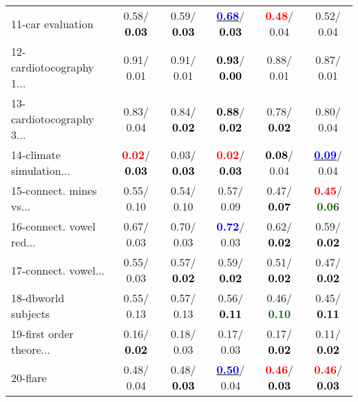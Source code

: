 \begin{table}[h]
\begin{center}
\begin{tabular}{lc|c|c|c|c}
11-car evaluation &   0.58/\textcolor{black}{\textbf{  0.03}} &   0.59/\textcolor{black}{\textbf{  0.03}} & \underline{\textcolor{blue}{\textbf{  0.68}}}/\textcolor{black}{\textbf{  0.03}} & \textcolor{red}{\textbf{  0.48}}/  0.04 &   0.52/  0.04 \\
12-cardiotocography 1... &   0.91/  0.01 &   0.91/  0.01 & \textcolor{black}{\textbf{  0.93}}/\textcolor{black}{\textbf{  0.00}} &   0.88/  0.01 &   0.87/  0.01 \\
13-cardiotocography 3... &   0.83/  0.04 &   0.84/\textcolor{black}{\textbf{  0.02}} & \textcolor{black}{\textbf{  0.88}}/\textcolor{black}{\textbf{  0.02}} &   0.78/\textcolor{black}{\textbf{  0.02}} &   0.80/  0.04 \\
14-climate simulation... & \textcolor{red}{\textbf{  0.02}}/\textcolor{black}{\textbf{  0.03}} &   0.03/\textcolor{black}{\textbf{  0.03}} & \textcolor{red}{\textbf{  0.02}}/\textcolor{black}{\textbf{  0.03}} & \textcolor{black}{\textbf{  0.08}}/  0.04 & \underline{\textcolor{blue}{\textbf{  0.09}}}/  0.04 \\ \hline
15-connect. mines vs... &   0.55/  0.10 &   0.54/  0.10 &   0.57/  0.09 &   0.47/\textcolor{black}{\textbf{  0.07}} & \textcolor{red}{\textbf{  0.45}}/\textcolor{darkgreen}{\textbf{  0.06}} \\
16-connect. vowel red... &   0.67/  0.03 &   0.70/  0.03 & \textcolor{blue}{\textbf{  0.72}}/  0.03 &   0.62/\textcolor{black}{\textbf{  0.02}} &   0.59/\textcolor{black}{\textbf{  0.02}} \\
17-connect. vowel... &   0.55/  0.03 &   0.57/\textcolor{black}{\textbf{  0.02}} &   0.59/\textcolor{black}{\textbf{  0.02}} &   0.51/\textcolor{black}{\textbf{  0.02}} &   0.47/\textcolor{black}{\textbf{  0.02}} \\
18-dbworld subjects &   0.55/  0.13 &   0.57/  0.13 &   0.56/\textcolor{black}{\textbf{  0.11}} &   0.46/\textcolor{darkgreen}{\textbf{  0.10}} &   0.45/\textcolor{black}{\textbf{  0.11}} \\
19-first order theore... &   0.16/\textcolor{black}{\textbf{  0.02}} &   0.18/  0.03 &   0.17/  0.03 &   0.17/\textcolor{black}{\textbf{  0.02}} &   0.11/\textcolor{black}{\textbf{  0.02}} \\
20-flare &   0.48/  0.04 &   0.48/\textcolor{black}{\textbf{  0.03}} & \underline{\textcolor{blue}{\textbf{  0.50}}}/  0.04 & \textcolor{red}{\textbf{  0.46}}/\textcolor{black}{\textbf{  0.03}} & \textcolor{red}{\textbf{  0.46}}/\textcolor{black}{\textbf{  0.03}} \\

\end{tabular}
\end{center}
\end{table}
